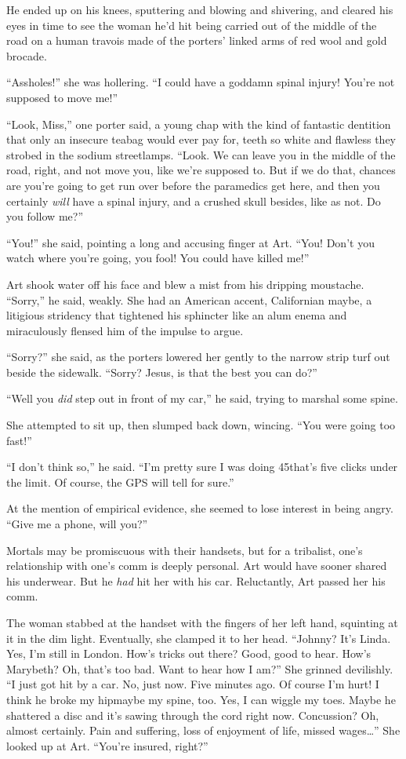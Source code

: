 He ended up on his knees, sputtering and blowing and shivering, and
cleared his eyes in time to see the woman he’d hit being carried
out of the middle of the road on a human travois made of the
porters’ linked arms of red wool and gold brocade.

“Assholes!” she was hollering. “I could have a goddamn spinal
injury! You’re not supposed to move me!”

“Look, Miss,” one porter said, a young chap with the kind of
fantastic dentition that only an insecure teabag would ever pay
for, teeth so white and flawless they strobed in the sodium
streetlamps. “Look. We can leave you in the middle of the road,
right, and not move you, like we’re supposed to. But if we do that,
chances are you’re going to get run over before the paramedics get
here, and then you certainly \emph{will} have a spinal injury, and
a crushed skull besides, like as not. Do you follow me?”

“You!” she said, pointing a long and accusing finger at Art. “You!
Don’t you watch where you’re going, you fool! You could have killed
me!”

Art shook water off his face and blew a mist from his dripping
moustache. “Sorry,” he said, weakly. She had an American accent,
Californian maybe, a litigious stridency that tightened his
sphincter like an alum enema and miraculously flensed him of the
impulse to argue.

“Sorry?” she said, as the porters lowered her gently to the narrow
strip turf out beside the sidewalk. “Sorry? Jesus, is that the best
you can do?”

“Well you \emph{did} step out in front of my car,” he said, trying
to marshal some spine.

She attempted to sit up, then slumped back down, wincing. “You were
going too fast!”

“I don’t think so,” he said. “I’m pretty sure I was doing 45{\dash}that’s
five clicks under the limit. Of course, the GPS will tell for
sure.”

At the mention of empirical evidence, she seemed to lose interest
in being angry. “Give me a phone, will you?”

Mortals may be promiscuous with their handsets, but for a
tribalist, one’s relationship with one’s comm is deeply personal.
Art would have sooner shared his underwear. But he \emph{had} hit
her with his car. Reluctantly, Art passed her his comm.

The woman stabbed at the handset with the fingers of her left hand,
squinting at it in the dim light. Eventually, she clamped it to her
head. “Johnny? It’s Linda. Yes, I’m still in London. How’s tricks
out there? Good, good to hear. How’s Marybeth? Oh, that’s too bad.
Want to hear how I am?” She grinned devilishly. “I just got hit by
a car. No, just now. Five minutes ago. Of course I’m hurt! I think
he broke my hip{\dash}maybe my spine, too. Yes, I can wiggle my toes.
Maybe he shattered a disc and it’s sawing through the cord right
now. Concussion? Oh, almost certainly. Pain and suffering, loss of
enjoyment of life, missed wages\ldots{}” She looked up at Art. “You’re
insured, right?”

